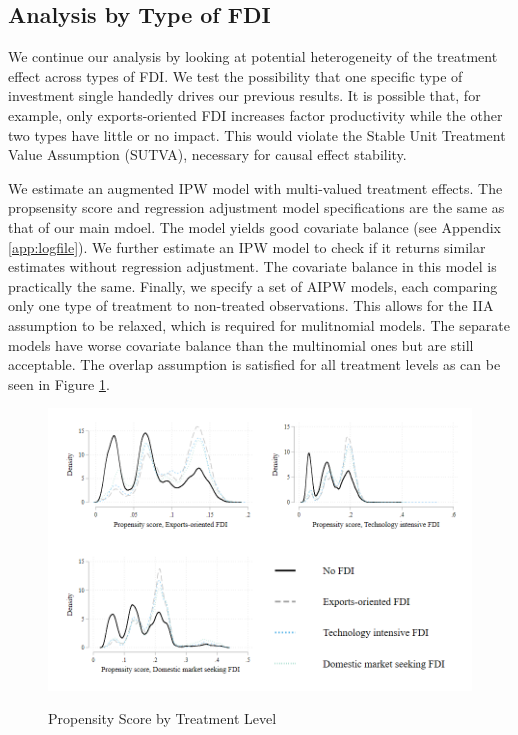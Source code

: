 \documentclass[a4paper,11pt]{scrartcl}
\begin{document}
\subsection{Analysis by Type of FDI}

We continue our analysis by looking at potential heterogeneity of the treatment effect across types of FDI. We test the possibility that one specific type of investment single handedly drives our previous results. It is possible that, for example, only exports-oriented FDI increases factor productivity while the other two types have little or no impact. This would violate the Stable Unit Treatment Value Assumption (SUTVA), necessary for causal effect stability. 

We estimate an augmented IPW model with multi-valued treatment effects. The propsensity score and regression adjustment model specifications are the same as that of our main mdoel. The model yields good covariate balance (see Appendix \ref{app:logfile}). We further estimate an IPW model to check if it returns similar estimates without regression adjustment. The covariate balance in this model is practically the same. Finally, we specify a set of AIPW models, each comparing only one type of treatment to non-treated observations. This allows for the IIA assumption to be relaxed, which is required for mulitnomial models. The separate models have worse covariate balance than the multinomial ones but are still acceptable. The overlap assumption is satisfied for all treatment levels as can be seen in Figure \ref{fig:over_typ}. 

\begin{figure}[h]
	
	\caption{Propensity Score by Treatment Level}
	\includegraphics[width=\linewidth]{overlap_type.png}
	\label{fig:over_typ}
 
\end{figure}
\FloatBarrier
\end{document}

